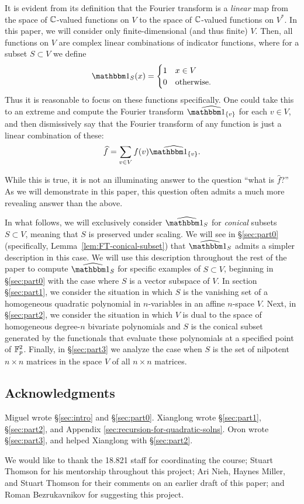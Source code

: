 It is evident from its definition that the Fourier transform is a \emph{linear} map from the space of $\mathbb{C}$-valued functions on $V$ to the space of $\mathbb{C}$-valued functions on $V^*$. In this paper, we will consider only finite-dimensional (and thus finite) $V$. Then, all functions on $V$ are complex linear combinations of indicator functions, where for a subset $S\subset V$ we define
\[ \IND_S(x) = \begin{cases}
1 & x \in V \\
0 & \text{otherwise.}     
\end{cases} \]
Thus it is reasonable to focus on these functions specifically. One could take this to an extreme and compute the Fourier transform $\widehat{\IND_{\{v\}}}$ for each $v\in V$, and then dismissively say that the Fourier transform of any function is just a linear combination of these:
\[
	\widehat{f} = \sum_{v\in V} f(v)\widehat{\IND_{\{v\}}}.
\]

While this is true, it is not an illuminating answer to the question ``what is $\widehat{f}$?'' As we will demonstrate in this paper, this question often admits a much more revealing answer than the above.

In what follows, we will exclusively consider $\widehat{\IND_S}$ for \emph{conical} subsets $S\subset V$, meaning that $S$ is preserved under scaling. We will see in \S\ref{sec:part0} (specifically, Lemma~\ref{lem:FT-conical-subset}) that $\widehat{\IND_S}$ admits a simpler description in this case. We will use this description throughout the rest of the paper to compute $\widehat{\IND_S}$ for specific examples of $S\subset V$, beginning in \S\ref{sec:part0} with the case where $S$ is a vector subspace of $V$. In section \S\ref{sec:part1}, we consider the situation in which $S$ is the vanishing set of a homogeneous quadratic polynomial in $n$-variables in an affine $n$-space $V$. Next, in \S\ref{sec:part2}, we consider the situation in which $V$ is dual to the space of homogeneous degree-$n$ bivariate polynomials and $S$ is the conical subset generated by the functionals that evaluate these polynomials at a specified point of $\mathbb{F}_p^2$. Finally, in \S\ref{sec:part3} we analyze the case when $S$ is the set of nilpotent $n\times n$ matrices in the space $V$ of all $n\times n$ matrices.

\subsection*{Acknowledgments} Miguel wrote \S\ref{sec:intro} and \S\ref{sec:part0}. Xianglong wrote \S\ref{sec:part1}, \S\ref{sec:part2}, and Appendix \ref{sec:recursion-for-quadratic-solns}. Oron wrote \S\ref{sec:part3}, and helped Xianglong with \S\ref{sec:part2}.

We would like to thank the 18.821 staff for coordinating the course; Stuart Thomson for his mentorship throughout this project; Ari Nieh, Haynes Miller, and Stuart Thomson for their comments on an earlier draft of this paper; and Roman Bezrukavnikov for suggesting this project.
